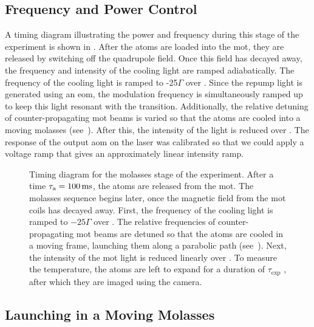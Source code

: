 \subsection{Frequency and Power Control}\label{subsec:molasses_control}
A timing diagram illustrating the power and frequency during this stage of the experiment is shown in . After the atoms are loaded into the \ac{mot}, they are released by switching off the quadrupole field. Once this field has decayed away, the frequency and intensity of the cooling light are ramped adiabatically. The frequency of the cooling light is ramped to -25\(\Gamma\) over . Since the repump light is generated using an \ac{eom}, the modulation frequency is simultaneously ramped up to keep this light resonant with the  transition. Additionally, the relative detuning of counter-propagating \ac{mot} beams is varied so that the atoms are cooled into a moving molasses (see~). After this, the intensity of the light is reduced over . The response of the output \ac{aom} on the \Muquans laser was calibrated so that we could apply a voltage ramp that gives an approximately linear intensity ramp.
\begin{figure}[!htbp]
    \centering
    \resizebox{0.6\textwidth}{!}{}
    \caption[Molasses stage timing diagram]{Timing diagram for the molasses stage of the experiment. After a time \(\tau_\text{a} = \sivalue{100}{\milli\second}\), the atoms are released from the \ac{mot}. The molasses sequence begins  later, once the magnetic field from the \ac{mot} coils has decayed away. First, the frequency of the cooling light is ramped to \(-25 \Gamma\) over . The relative frequencies of counter-propagating \ac{mot} beams are detuned so that the atoms are cooled in a moving frame, launching them along a parabolic path (see~). Next, the intensity of the \ac{mot} light is reduced linearly over . To measure the temperature, the atoms are left to expand for a duration of \(\tau_\text{exp}\) \sivalue{}{\milli\second}, after which they are imaged using the camera.}
    \label{fig:molasses_timing}
\end{figure}
\subsection{Launching in a Moving Molasses}\label{subsec:moving_molasses}

